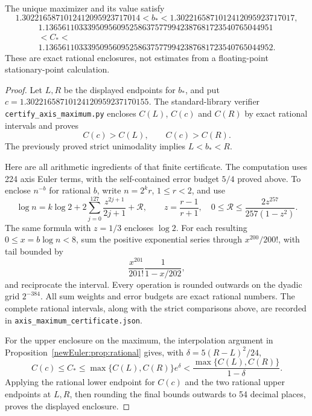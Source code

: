 \begin{proposition}
\label{newEuler:prop:narrow}
The unique maximizer and its value satisfy
\[
 1.3022165871012412095923717014
 <b_*<1.3022165871012412095923717017,
\]
\[
 \begin{gathered}
 1.136561103339509560952586375779942387681723540765044951\\
 <C_*<\\
 1.136561103339509560952586375779942387681723540765044952.
 \end{gathered}
\]
These are exact rational enclosures, not estimates from a
floating-point stationary-point calculation.
\end{proposition}
\begin{proof}
Let $L,R$ be the displayed endpoints for $b_*$, and put
$c=1.30221658710124120959237170155$. The standard-library verifier
\texttt{certify\_axis\_maximum.py} encloses $C(L)$, $C(c)$ and
$C(R)$ by exact rational intervals and proves
\[
 C(c)>C(L),\qquad C(c)>C(R).
\]
The previously proved strict unimodality implies $L<b_*<R$.

Here are all arithmetic ingredients of that finite certificate.
The computation uses 224 axis Euler terms, with the self-contained
error budget $5/4$ proved above. To enclose $n^{-b}$ for rational $b$, write
$n=2^k r$, $1\le r<2$, and use
\[
 \log n=k\log2+2\sum_{j=0}^{127}\frac{z^{2j+1}}{2j+1}
             +\mathcal R,\qquad z=\frac{r-1}{r+1},
 \quad 0\le\mathcal R\le\frac{2z^{257}}{257(1-z^2)}.
\]
The same formula with $z=1/3$ encloses $\log2$. For each resulting
$0\le x=b\log n<8$, sum the positive exponential series through
$x^{200}/200!$, with tail bounded by
\[
 \frac{x^{201}}{201!}\frac1{1-x/202},
\]
and reciprocate the interval. Every operation is rounded outwards
on the dyadic grid $2^{-384}$. All sum weights and error budgets
are exact rational numbers. The complete rational intervals, along
with the strict comparisons above, are recorded in
\texttt{axis\_maximum\_certificate.json}.

For the upper enclosure on the maximum, the interpolation argument
in Proposition~\ref{newEuler:prop:rational} gives, with
$\delta=5(R-L)^2/24$,
\[
 C(c)\le C_*\le\max\{C(L),C(R)\}e^{\delta}
 <\frac{\max\{C(L),C(R)\}}{1-\delta}.
\]
Applying the rational lower endpoint for $C(c)$ and the two rational upper
endpoints at $L,R$, then rounding the final bounds outwards to
54 decimal places, proves the displayed enclosure.
\end{proof}
